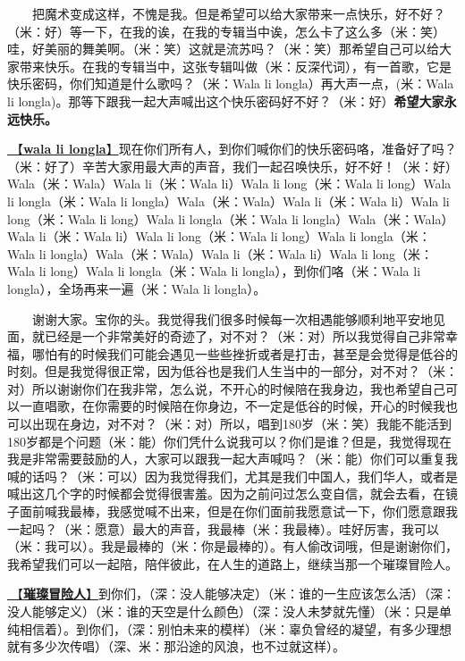 \documentclass[]{ctexbook}
\begin{document}
  把魔术变成这样，不愧是我。但是希望可以给大家带来一点快乐，好不好？（米：好）等一下，在我的诶，在我的专辑当中诶，怎么卡了这么多（米：笑）哇，好美丽的舞美啊。（米：笑）这就是流苏吗？（米：笑）那希望自己可以给大家带来快乐。在我的专辑当中，这张专辑叫做（米：反深代词），有一首歌，它是快乐密码，你们知道是什么歌吗？（米：Wala li longla）再大声一点，(米：Wala li longla)。那等下跟我一起大声喊出这个快乐密码好不好？（米：好）\textbf{希望大家永远快乐。}

\hyperref[wala-li-longla]{🎵【\textbf{wala li longla}】}现在你们所有人，到你们喊你们的快乐密码咯，准备好了吗？（米：好了）辛苦大家用最大声的声音，我们一起召唤快乐，好不好！（米：好）Wala（米：Wala）Wala li（米：Wala li）Wala li long（米：Wala li long）Wala li longla（米：Wala li longla）Wala（米：Wala）Wala li（米：Wala li）Wala li long（米：Wala li long）Wala li longla（米：Wala li longla）Wala（米：Wala）Wala li（米：Wala li）Wala li long（米：Wala li long）Wala li longla（米：Wala li longla）Wala（米：Wala）Wala li（米：Wala li）Wala li long（米：Wala li long）Wala li longla（米：Wala li longla），到你们咯（米：Wala li longla），全场再来一遍（米：Wala li longla）。

  谢谢大家。宝你的头。我觉得我们很多时候每一次相遇能够顺利地平安地见面，就已经是一个非常美好的奇迹了，对不对？（米：对）所以我觉得自己非常幸福，哪怕有的时候我们可能会遇见一些些挫折或者是打击，甚至是会觉得是低谷的时刻。但是我觉得很正常，因为低谷也是我们人生当中的一部分，对不对？（米：对）所以谢谢你们在我非常，怎么说，不开心的时候陪在我身边，我也希望自己可以一直唱歌，在你需要的时候陪在你身边，不一定是低谷的时候，开心的时候我也可以出现在身边，对不对？（米：对）所以，唱到180岁（米：笑）我能不能活到180岁都是个问题（米：能）你们凭什么说我可以？你们是谁？但是，我觉得现在我是非常需要鼓励的人，大家可以跟我一起大声喊吗？（米：能）你们可以重复我喊的话吗？（米：可以）因为我觉得我们，尤其是我们中国人，我们华人，或者是喊出这几个字的时候都会觉得很害羞。因为之前问过怎么变自信，就会去看，在镜子面前喊我最棒，我感觉喊不出来，但是在你们面前我愿意试一下，你们愿意跟我一起吗？（米：愿意）最大的声音，我最棒（米：我最棒）。哇好厉害，我可以（米：我可以）。我是最棒的（米：你是最棒的）。有人偷改词哦，但是谢谢你们，我希望我们可以一起陪，陪伴彼此，在人生的道路上，继续当那一个璀璨冒险人。

\hyperref[adventurers]{🎵【\textbf{璀璨冒险人}】}到你们，（深：没人能够决定）（米：谁的一生应该怎么活）（深：没人能够定义）（米：谁的天空是什么颜色）（深：没人未梦就先懂）（米：只是单纯相信着）。到你们，（深：别怕未来的模样）（米：辜负曾经的凝望，有多少理想就有多少次传唱）（深、米：那沿途的风浪，也不过就这样）。
\end{document}
